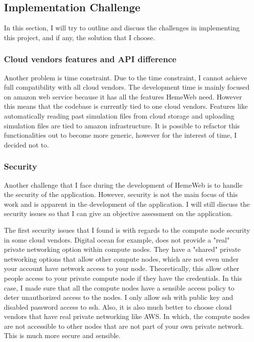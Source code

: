 \subsection{Implementation Challenge}


In this section, I will try to outline and discuss the challenges in implementing this project, and if any, the solution that I choose.

\subsubsection{Cloud vendors features and API difference}


Another problem is time constraint. Due to the time constraint, I cannot achieve full compatibility with all cloud vendors. The development time is mainly focused on amazon web service because it has all the features HemeWeb need. However this means that the codebase is currently tied to one cloud vendors. Features like automatically reading past simulation files from cloud storage and uploading simulation files are tied to amazon infrastructure. It is possible to refactor this functionalities out to become more generic, however for the interest of time, I decided not to.

\subsubsection{Security}

Another challenge that I face during the development of HemeWeb is to handle the security of the application. However, security is not the main focus of this work and is apparent in the development of the application. I will still discuss the security issues so that I can give an objective assessment on the application.

The first security issues that I found is with regards to the compute node security in some cloud vendors. Digital ocean for example, does not provide a "real" private networking option within compute nodes. They have a "shared" private networking options that allow other compute nodes, which are not even under your account have network access to your node. Theoretically, this allow other people access to your private compute node if they have the credentials. In this case, I made sure that all the compute nodes have a sensible access policy to deter unauthorized access to the nodes. I only allow ssh with public key and disabled password access to ssh. Also, it is also much better to choose cloud vendors that have real private networking like AWS. In which, the compute nodes are not accessible to other nodes that are not part of your own private network. This is much more secure and sensible.


